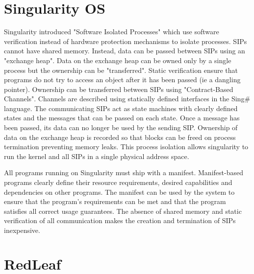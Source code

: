 
\section{Singularity OS}
Singularity\cite{singularity} introduced "Software Isolated Processes" which use software verification instead of hardware protection mechanisms to isolate processes. SIPs cannot have shared memory. Instead, data can be passed between SIPs using an "exchange heap". Data on the exchange heap can be owned only by a single process but the ownership can be "transferred". Static verification ensure that programs do not try to access an object after it has been passed (ie a dangling pointer). Ownership can be transferred between SIPs using "Contract-Based Channels". Channels are described using statically defined interfaces in the Sing\# language. The communicating SIPs act as state machines with clearly defined states and the messages that can be passed on each state. Once a message has been passed, its data can no longer be used by the sending SIP. Ownership of data on the exchange heap is recorded so that blocks can be freed on process termination preventing memory leaks. This process isolation allows singularity to run the kernel and all SIPs in a single physical address space.

All programs running on Singularity must ship with a manifest. Manifest-based programs clearly define their resource requirements, desired capabilities and dependencies on other programs. The manifest can be used by the system to ensure that the program's requirements can be met and that the program satisfies all correct usage guarantees. The absence of shared memory and static verification of all communication makes the creation and termination of SIPs inexpensive.

\section{RedLeaf}


